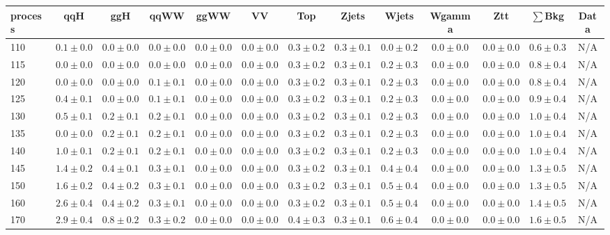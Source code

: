 \begin{table}
{%
 \tiny
 \begin{center}
 \begin{tabular}{l | c c | c c c c c c c c  | c c}
 \hline
 process & qqH & ggH & qqWW & ggWW & VV & Top & Zjets & Wjets & Wgamma & Ztt & $\sum$Bkg & Data \\
 \hline
110 & $0.1\pm0.0$ & $0.0\pm0.0$ & $0.0\pm0.0$ & $0.0\pm0.0$ & $0.0\pm0.0$ & $0.3\pm0.2$ & $0.3\pm0.1$ & $0.0\pm0.2$ & $0.0\pm0.0$ & $0.0\pm0.0$ & $0.6\pm0.3$ & N/A \\
115 & $0.0\pm0.0$ & $0.0\pm0.0$ & $0.0\pm0.0$ & $0.0\pm0.0$ & $0.0\pm0.0$ & $0.3\pm0.2$ & $0.3\pm0.1$ & $0.2\pm0.3$ & $0.0\pm0.0$ & $0.0\pm0.0$ & $0.8\pm0.4$ & N/A \\
120 & $0.0\pm0.0$ & $0.0\pm0.0$ & $0.1\pm0.1$ & $0.0\pm0.0$ & $0.0\pm0.0$ & $0.3\pm0.2$ & $0.3\pm0.1$ & $0.2\pm0.3$ & $0.0\pm0.0$ & $0.0\pm0.0$ & $0.8\pm0.4$ & N/A \\
125 & $0.4\pm0.1$ & $0.0\pm0.0$ & $0.1\pm0.1$ & $0.0\pm0.0$ & $0.0\pm0.0$ & $0.3\pm0.2$ & $0.3\pm0.1$ & $0.2\pm0.3$ & $0.0\pm0.0$ & $0.0\pm0.0$ & $0.9\pm0.4$ & N/A \\
130 & $0.5\pm0.1$ & $0.2\pm0.1$ & $0.2\pm0.1$ & $0.0\pm0.0$ & $0.0\pm0.0$ & $0.3\pm0.2$ & $0.3\pm0.1$ & $0.2\pm0.3$ & $0.0\pm0.0$ & $0.0\pm0.0$ & $1.0\pm0.4$ & N/A \\
135 & $0.0\pm0.0$ & $0.2\pm0.1$ & $0.2\pm0.1$ & $0.0\pm0.0$ & $0.0\pm0.0$ & $0.3\pm0.2$ & $0.3\pm0.1$ & $0.2\pm0.3$ & $0.0\pm0.0$ & $0.0\pm0.0$ & $1.0\pm0.4$ & N/A \\
140 & $1.0\pm0.1$ & $0.2\pm0.1$ & $0.2\pm0.1$ & $0.0\pm0.0$ & $0.0\pm0.0$ & $0.3\pm0.2$ & $0.3\pm0.1$ & $0.2\pm0.3$ & $0.0\pm0.0$ & $0.0\pm0.0$ & $1.0\pm0.4$ & N/A \\
145 & $1.4\pm0.2$ & $0.4\pm0.1$ & $0.3\pm0.1$ & $0.0\pm0.0$ & $0.0\pm0.0$ & $0.3\pm0.2$ & $0.3\pm0.1$ & $0.4\pm0.4$ & $0.0\pm0.0$ & $0.0\pm0.0$ & $1.3\pm0.5$ & N/A \\
150 & $1.6\pm0.2$ & $0.4\pm0.2$ & $0.3\pm0.1$ & $0.0\pm0.0$ & $0.0\pm0.0$ & $0.3\pm0.2$ & $0.3\pm0.1$ & $0.5\pm0.4$ & $0.0\pm0.0$ & $0.0\pm0.0$ & $1.3\pm0.5$ & N/A \\
160 & $2.6\pm0.4$ & $0.4\pm0.2$ & $0.3\pm0.1$ & $0.0\pm0.0$ & $0.0\pm0.0$ & $0.3\pm0.2$ & $0.3\pm0.1$ & $0.5\pm0.4$ & $0.0\pm0.0$ & $0.0\pm0.0$ & $1.4\pm0.5$ & N/A \\
170 & $2.9\pm0.4$ & $0.8\pm0.2$ & $0.3\pm0.2$ & $0.0\pm0.0$ & $0.0\pm0.0$ & $0.4\pm0.3$ & $0.3\pm0.1$ & $0.6\pm0.4$ & $0.0\pm0.0$ & $0.0\pm0.0$ & $1.6\pm0.5$ & N/A \\

\end{tabular}
\end{center}}
\end{table}
